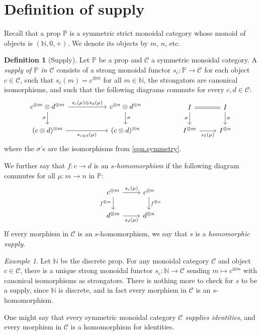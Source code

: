 \documentclass[11pt, oneside, article]{memoir}
\theoremstyle{plain}
\theoremstyle{definition}
\newtheorem{definition}[theorem]{Definition}
\theoremstyle{remark}
\newtheorem{example}[theorem]{Example}
\newcommand{\cat}[1]{\mathcal{#1}}%
\newcommand{\tpow}[1]{^{\otimes #1}}
\newcommand{\nn}{\mathbb{N}}
\newcommand{\pp}{\mathbb{P}}
\begin{document}
\section{Definition of supply}\label{sec.supply}

Recall that a prop $\pp$ is a symmetric strict monoidal category whose monoid of objects is $(\nn,0,+)$. We denote its objects by $m$, $n$, etc.

\begin{definition}[Supply]\label{def.supply}
Let $\pp$ be a prop and $\cat{C}$ a symmetric monoidal category. A \emph{supply of $\pp$ in $\cat{C}$} consists of a strong monoidal functor $s_c\colon\pp\to\cat{C}$ for each object $c\in\cat{C}$, such that $s_c(m)=c\tpow{m}$ for all $m\in\nn$, the strongators are canonical isomorphisms, and such that the following diagrams commute for every $c,d\in\cat{C}$:
\begin{equation}\label{eqn.supply_commute_tensors}
\begin{tikzcd}[column sep=55pt]
	c\tpow{m}\otimes d\tpow{m}\ar[r, "s_c(\mu)\otimes s_d(\mu)"]\ar[d, "\sigma"']&
	c\tpow{n}\otimes d\tpow{n}\ar[d, "\sigma"]\\
	(c\otimes d)\tpow{m}\ar[r, "s_{c\otimes d}(\mu)"']&
	(c\otimes d)\tpow{n}
\end{tikzcd}
\hspace{.7in}
\begin{tikzcd}
	I\ar[r, equal]\ar[d, "\sigma"']&
	I\ar[d, "\sigma"]\\
	I\tpow{m}\ar[r, "s_I(\mu)"']&
	I\tpow{n}
\end{tikzcd}
\end{equation}
where the $\sigma$'s are the isomorphisms from \cref{eqn.symmetry}.

We further say that $f\colon c\to d$ is an \emph{$s$-homomorphism} if the following diagram commutes for all $\mu\colon m\to n$ in $\pp$:
\begin{equation}\label{eqn.nat_means_homo}
\begin{tikzcd}
	c\tpow{m}\ar[r, "s_c(\mu)"]\ar[d, "f\tpow{m}"']&
	c\tpow{n}\ar[d, "f\tpow{n}"]\\
	d\tpow{m}\ar[r, "s_d(\mu)"']&
	d\tpow{n}
\end{tikzcd}
\end{equation}
If every morphism in $\cat{C}$ is an $s$-homomorphism, we say that $s$ is a \emph{homomorphic supply}.
\end{definition}

\begin{example}\label{ex.supply_ids}
Let $\nn$ be the discrete prop. For any monoidal category $\cat{C}$ and object $c\in\cat{C}$, there is a unique strong monoidal functor $s_c\colon\nn\to\cat{C}$ sending $m\mapsto c\tpow{m}$ with canonical isomorphisms as strongators. There is nothing more to check for $s$ to be a supply, since $\nn$ is discrete, and in fact every morphism in $\cat{C}$ is an $s$-homomorphism. 

One might say that every symmetric monoidal category $\cat{C}$ \emph{supplies identities}, and every morphism in $\cat{C}$ is a homomorphism for identities.
\end{example}
\end{document}
